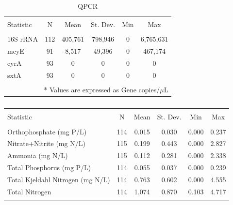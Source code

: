 \documentclass{ou-thesis}
\begin{document}
\begin{appendix}
\newpage














\newpage


\begin{table}[!htbp]
  \centering
  \caption{QPCR}
  \label{QPCR}
  \begin{tabular}{@{\extracolsep{5pt}}lccccc}
  \\[-1.8ex]\hline
  \hline \\[-1.8ex]
  Statistic & \multicolumn{1}{c}{N} & \multicolumn{1}{c}{Mean} & \multicolumn{1}{c}{St. Dev.} & \multicolumn{1}{c}{Min} & \multicolumn{1}{c}{Max} \\
  \hline \\[-1.8ex]
  16S rRNA & 112 & 405,761 & 798,946 & 0 & 6,765,631 \\
  mcyE & 91 & 8,517 & 49,396 & 0 & 467,174 \\
  cyrA & 93 & 0 & 0 & 0 & 0 \\
  sxtA & 93 & 0 & 0 & 0 & 0 \\
  \hline \\[-1.8ex]
  \multicolumn{6}{r}{* Values are expressed as Gene copies/$\mu$L} \\
  \end{tabular}
  \end{table}

\newpage


\begin{table}[!htbp]
  \centering
  \caption{}
  \label{}
\begin{tabular}{@{\extracolsep{5pt}}lccccc}
\\[-1.8ex]\hline
\hline \\[-1.8ex]
Statistic & \multicolumn{1}{c}{N} & \multicolumn{1}{c}{Mean} & \multicolumn{1}{c}{St. Dev.} & \multicolumn{1}{c}{Min} & \multicolumn{1}{c}{Max} \\
\hline \\[-1.8ex]
 Orthophosphate (mg P/L) & 114 & 0.015 & 0.030 & 0.000 & 0.237 \\
Nitrate+Nitrite (mg N/L) & 115 & 0.199 & 0.443 & 0.000 & 2.827 \\
Ammonia (mg N/L)  & 115 & 0.112 & 0.281 & 0.000 & 2.338 \\
Total Phosphorus (mg P/L) & 114 & 0.055 & 0.037 & 0.000 & 0.239 \\
Total Kjeldahl Nitrogen (mg N/L) & 114 & 0.763 & 0.602 & 0.000 & 4.555 \\
Total Nitrogen & 114 & 1.074 & 0.870 & 0.103 & 4.717 \\
\hline \\[-1.8ex]
\end{tabular}
\end{table}



\end{appendix}
\end{document}

